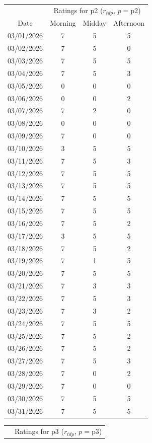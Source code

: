 \documentclass{notes}
\begin{document}
\begin{center}
	\vspace{1em}

	\begin{tabular}{c|ccc}
		& \multicolumn{3}{c}{Ratings for p2 ($r_{tdp}$, $p=\text{p2}$)}\\
		Date & Morning & Midday & Afternoon\\
		\hline
		03/01/2026 & 7 & 5 & 5\\
		03/02/2026 & 7 & 5 & 0\\
		03/03/2026 & 7 & 5 & 5\\
		03/04/2026 & 7 & 5 & 3\\
		03/05/2026 & 0 & 0 & 0\\
		03/06/2026 & 0 & 0 & 2\\
		03/07/2026 & 7 & 2 & 0\\
		03/08/2026 & 0 & 0 & 0\\
		03/09/2026 & 7 & 0 & 0\\
		03/10/2026 & 3 & 5 & 5\\
		03/11/2026 & 7 & 5 & 3\\
		03/12/2026 & 7 & 5 & 5\\
		03/13/2026 & 7 & 5 & 5\\
		03/14/2026 & 7 & 5 & 5\\
		03/15/2026 & 7 & 5 & 5\\
		03/16/2026 & 7 & 5 & 2\\
		03/17/2026 & 3 & 5 & 5\\
		03/18/2026 & 7 & 5 & 2\\
		03/19/2026 & 7 & 1 & 5\\
		03/20/2026 & 7 & 5 & 5\\
		03/21/2026 & 7 & 3 & 3\\
		03/22/2026 & 7 & 5 & 3\\
		03/23/2026 & 7 & 3 & 2\\
		03/24/2026 & 7 & 5 & 5\\
		03/25/2026 & 7 & 5 & 2\\
		03/26/2026 & 7 & 5 & 2\\
		03/27/2026 & 7 & 5 & 3\\
		03/28/2026 & 7 & 0 & 2\\
		03/29/2026 & 7 & 0 & 0\\
		03/30/2026 & 7 & 5 & 5\\
		03/31/2026 & 7 & 5 & 5
	\end{tabular}\qquad
	\begin{tabular}{c|ccc}
		& \multicolumn{3}{c}{Ratings for p3 ($r_{tdp}$, $p=\text{p3}$)}\\

\end{tabular}
\end{center}
\end{document}
